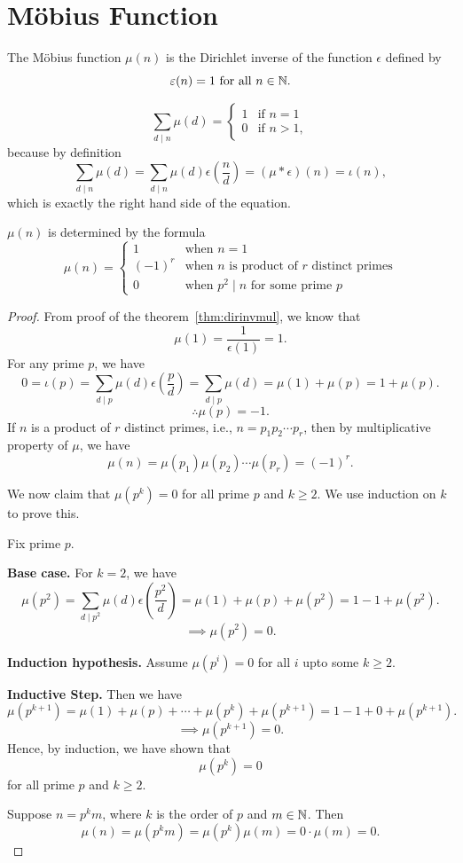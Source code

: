 \section{Möbius Function}
\begin{definition}
    The Möbius function $\mu(n)$ is the Dirichlet inverse of the function $\epsilon$ defined by \[\varepsilon(n) = 1 \text{ for all } n \in \mathbb{N}.\]
\end{definition}

\[\sum_{d \mid n} \mu(d) = \begin{cases}
    1 & \text{if } n = 1\\
    0 & \text{if } n > 1,
\end{cases}\]
because by definition \[\sum_{d \mid n} \mu(d) = \sum_{d \mid n}\mu(d) \epsilon(\frac{n}{d})= (\mu \ast \epsilon)(n) = \iota(n),\] which is exactly the right hand side of the equation.

\begin{theorem}
    $\mu(n)$ is determined by the formula \[\mu(n) = \begin{cases}
        1 & \text{when } n = 1\\
        (-1)^r & \text{when $n$ is product of $r$ distinct primes}\\
        0 & \text{when $p^2 \mid n$ for some prime $p$}
    \end{cases}\]
\end{theorem}
\begin{proof}
    From proof of the theorem~\ref{thm:dirinvmul}, we know that \[\mu(1) = \frac{1}{\epsilon(1)} = 1.\]
    For any prime $p$, we have \[0 = \iota(p) = \sum_{d \mid p} \mu(d) \epsilon(\frac{p}{d}) = \sum_{d \mid p} \mu(d) = \mu(1) + \mu(p) = 1 + \mu(p).\]
    \[\therefore \mu(p) = -1.\]
    If $n$ is a product of $r$ distinct primes, i.e., $n = p_1p_2 \cdots p_r$, then by multiplicative property of $\mu$, we have \[\mu(n) = \mu(p_1)\mu(p_2)\cdots\mu(p_r) = (-1)^r.\]

    We now claim that $\mu(p^k) = 0$ for all prime $p$ and $k \ge 2$. We use induction on $k$ to prove this.

    Fix prime $p$. 

    \textbf{Base case.} For $k = 2$, we have \[\mu(p^2) = \sum_{d \mid p^2} \mu(d) \epsilon(\frac{p^2}{d}) = \mu(1) + \mu(p) + \mu(p^2) = 1 - 1 + \mu(p^2).\]
    \[\implies \mu(p^2) = 0.\]

    \textbf{Induction hypothesis.} Assume $\mu(p^i) = 0$ for all $i$ upto some $k \ge 2$. 
    
    \textbf{Inductive Step.} Then we have \[\mu(p^{k+1}) = \mu(1) + \mu(p) + \cdots + \mu(p^k) + \mu(p^{k+1}) = 1 - 1 + 0 + \mu(p^{k+1}).\]
    \[\implies \mu(p^{k+1}) = 0.\]
    Hence, by induction, we have shown that \[\mu(p^k) = 0\] for all prime $p$ and $k \ge 2$.

    Suppose $n = p^km$, where $k$ is the order of $p$ and $m \in \mathbb{N}$. Then \[\mu(n) = \mu(p^km) = \mu(p^k)\mu(m) = 0 \cdot \mu(m) = 0.\]
\end{proof}

